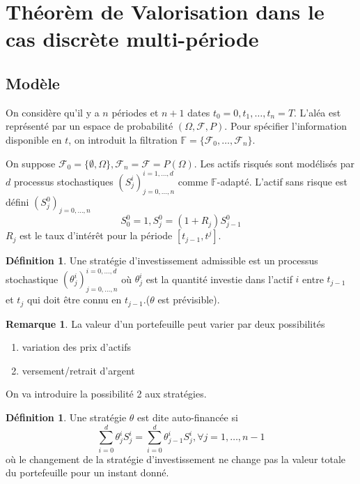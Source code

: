 \documentclass{article}
\theoremstyle{plain}
\theoremstyle{definition}
\newtheorem{defn}[thm]{D\'efinition}
\newtheorem{remq}[thm]{Remarque}
\begin{document}
\section{Th\'eor\`em de Valorisation dans le cas discr\`ete multi-p\'eriode}
\subsection{Mod\`ele}
On consid\`ere qu'il y a $n$ p\'eriodes et $n+1$ dates ${t_0=0,t_1,\ldots,t_n=T}$. L'al\'ea est repr\'esent\'e par un espace de probabilit\'e $(\Omega,\mathcal{F},P)$. Pour sp\'ecifier l'information disponible en $t$, on introduit la filtration $\mathbb{F}=\{\mathcal{F}_0,\ldots,\mathcal{F}_n\}$. 

On suppose $\mathcal{F}_0=\{\emptyset,\Omega\},\mathcal{F}_n=\mathcal{F}=P(\Omega)$. Les actifs risqu\'es sont mod\'elis\'es par $d$ processus stochastiques $(S^i_j)_{j=0,\ldots,n}^{i=1,\ldots,d}$ comme $\mathbb{F}$-adapt\'e. L'actif sans risque est d\'efini $(S_j^0)_{j=0,\ldots,n}$
\begin{equation}
S_0^0=1,S_j^0=(1+R_j)S_{j-1}^0
\end{equation} 
$R_j$ est le taux d'int\'er\^et pour la p\'eriode $[t_{j-1},t^j]$.

\begin{defn}
	Une strat\'egie d'investissement admissible est un processus stochastique $(\theta_j^i)_{j=0,\ldots,n}^{i=0,\ldots,d}$ o\`u $\theta_j^i$ est la quantit\'e investie dans l'actif $i$ entre $t_{j-1}$ et $t_j$ qui doit \^etre connu en $t_{j-1}$.($\theta$ est pr\'evisible).
\end{defn}

\begin{remq}
	La valeur d'un portefeuille peut varier par deux possibilit\'es
	\begin{enumerate}
		\item variation des prix d'actifs
		\item versement/retrait d'argent
	\end{enumerate}
\end{remq}

On va introduire la possibilit\'e 2 aux strat\'egies. 

\begin{defn}
	Une strat\'egie $\theta$ est dite auto-financ\'ee si 
\begin{equation}
\sum_{i=0}^d\theta_j^i S_j^i=\sum_{i=0}^d\theta_{j-1}^i S_j^i, \forall j=1,\ldots,n-1
\end{equation}
o\`u le changement de la strat\'egie d'investissement ne change pas la valeur totale du portefeuille pour un instant donn\'e.
\end{defn}
\end{document}
